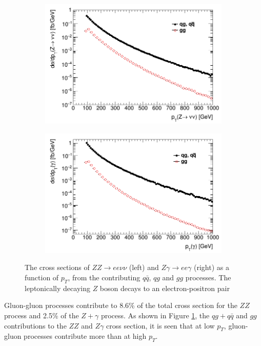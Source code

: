 \documentclass[11pt,a4paper,openright,twoside]{report}
\begin{document}
\begin{figure}[H]
\centering
	\begin{subfigure}{0.49\textwidth}
		\includegraphics[width=\linewidth]{ZZ_subproc.png}
	\end{subfigure}
	\begin{subfigure}{0.49\textwidth}
		\includegraphics[width=\linewidth]{Zg_subproc.png}
	\end{subfigure}	
\caption{The cross sections of $ZZ\to ee\nu\nu$ (left) and $Z\gamma\to ee\gamma$ (right) as a function of $p_T$, from the contributing $q\bar{q}$, $qg$ and $gg$ processes. The leptonically decaying $Z$ boson decays to an electron-positron pair}
\label{fig:xsec_gg_qq}
\end{figure}

Gluon-gluon processes contribute to 8.6\% of the total cross section for the $ZZ$ process and 2.5\% of the $Z+\gamma$ process. As shown in Figure \ref{fig:xsec_gg_qq}, the $qg+q\bar{q}$ and $gg$ contributions to the $ZZ$ and $Z\gamma$ cross section, it is seen that at low $p_T$, gluon-gluon processes contribute more than at high $p_T$.
\end{document}

